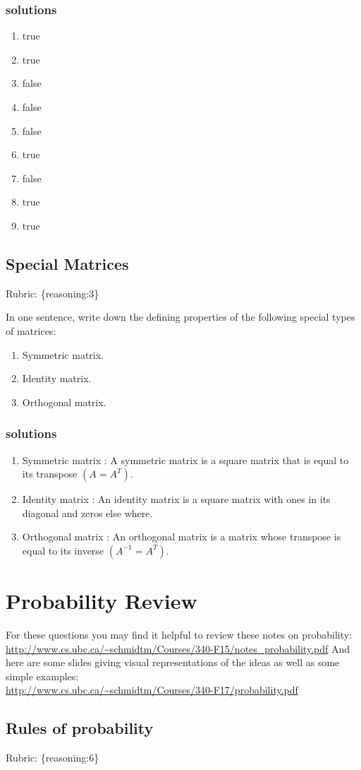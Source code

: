 \documentclass{article}
\def\rubric#1{\gre{Rubric: \{#1\}}}{}
\def\blu#1{{\color{blu}#1}}
\def\gre#1{{\color{gre}#1}}
\def\enum#1{\begin{enumerate}#1\end{enumerate}}
\begin{document}
\subsubsection{solutions}
\enum{
\item true
\item true
\item false
\item false
\item false
\item true
\item false
\item true
\item true
}

\subsection{Special Matrices}
\rubric{reasoning:3}

\blu{In one sentence, write down the defining properties of the following special types of matrices}:
\enum{
\item Symmetric matrix.
\item Identity matrix.
\item Orthogonal matrix.
}
\subsubsection{solutions}
\enum{
\item  Symmetric matrix : A symmetric matrix is a square matrix that is equal to its transpose $(A = A^T).$
\item  Identity matrix :  An identity matrix is a square matrix with ones in its diagonal and zeros else where.
\item  Orthogonal matrix : An orthogonal matrix is a matrix whose transpose is equal to its inverse $(A^{-1} = A^T).$
}
\section{Probability Review}
For these questions you may find it helpful to review these notes on probability:\\
\url{http://www.cs.ubc.ca/~schmidtm/Courses/340-F15/notes_probability.pdf}
And here are some slides giving visual representations of the ideas as well as some simple examples:\\
\url{http://www.cs.ubc.ca/~schmidtm/Courses/340-F17/probability.pdf}

\subsection{Rules of probability}
\rubric{reasoning:6}
\end{document}
